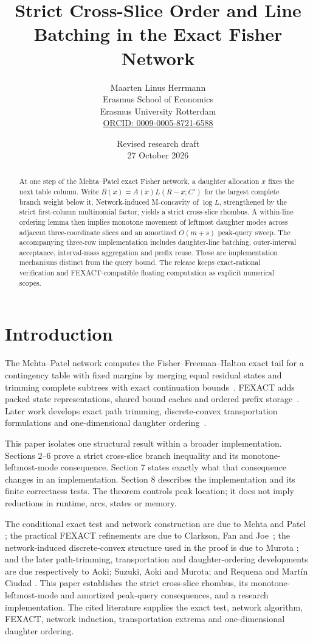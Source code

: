 \documentclass[10pt]{article}
\title{Strict Cross-Slice Order and Line Batching in the Exact Fisher Network}
\author{Maarten Linus Herrmann\\
\small Erasmus School of Economics\\
\small Erasmus University Rotterdam\\
\small\href{https://orcid.org/0009-0005-8721-6588}{ORCID: 0009-0005-8721-6588}}
\date{\small Revised research draft\\
\small 27 October 2026}
\begin{document}
\maketitle

\begin{abstract}
At one step of the Mehta--Patel exact Fisher network, a daughter
allocation \(x\) fixes the next table column.  Write
\(B(x)=A(x)L(R-x;C')\) for the largest complete branch weight below it.
Network-induced M-concavity of \(\log L\), strengthened by the strict
first-column multinomial factor, yields a strict cross-slice rhombus.
A within-line ordering lemma then implies monotone movement of leftmost
daughter modes across adjacent three-coordinate slices and an amortized
\(O(m+s)\) peak-query sweep.  The accompanying three-row implementation includes daughter-line
batching, outer-interval acceptance, interval-mass aggregation and prefix
reuse. These are implementation mechanisms distinct from the query bound.
The release keeps exact-rational verification
and FEXACT-compatible floating computation as explicit numerical scopes.
\end{abstract}

\section{Introduction}

The Mehta--Patel network computes the Fisher--Freeman--Halton exact tail
for a contingency table with fixed margins by merging equal residual
states and trimming complete subtrees with exact continuation
bounds~\cite{mehta1983,mehta1986}.  FEXACT adds packed state
representations, shared bound caches and ordered prefix
storage~\cite{clarkson1993}.  Later work develops exact path trimming,
discrete-convex transportation formulations and one-dimensional
daughter ordering~\cite{aoki2002,suzuki2005,requena2006}.

This paper isolates one structural result within a broader implementation.
Sections 2--6 prove a strict cross-slice branch inequality and its
monotone-leftmost-mode consequence.  Section 7 states exactly what that
consequence changes in an implementation.  Section 8 describes the implementation and its finite correctness tests.
The theorem controls peak location; it does not imply reductions in runtime,
arcs, states or memory.

The conditional exact test and network construction are due to Mehta and Patel
\cite{mehta1983,mehta1986}; the practical FEXACT refinements are due to
Clarkson, Fan and Joe~\cite{clarkson1993}; the network-induced
discrete-convex structure used in the proof is due to Murota
\cite{murota1996,murota2021}; and the later path-trimming,
transportation and daughter-ordering developments are due respectively
to Aoki; Suzuki, Aoki and Murota; and Requena and Mart\'in Ciudad
\cite{aoki2002,suzuki2005,requena2006}.  This paper establishes the strict
cross-slice rhombus, its monotone-leftmost-mode and amortized peak-query
consequences, and a research implementation.  The cited literature
supplies the exact test, network algorithm, FEXACT, network induction,
transportation extrema and one-dimensional daughter ordering.
\end{document}
